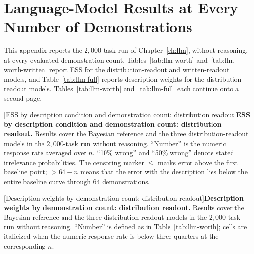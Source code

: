 \chapter{Language-Model Results at Every Number of Demonstrations}\label{app:llm-tables}

This appendix reports the $2{,}000$-task run of Chapter~\ref{ch:llm}, without reasoning, at every evaluated demonstration count. Tables~\ref{tab:llm-worth} and~\ref{tab:llm-worth-written} report ESS for the distribution-readout and written-readout models, and Table~\ref{tab:llm-full} reports description weights for the distribution-readout models. Tables~\ref{tab:llm-worth} and~\ref{tab:llm-full} each continue onto a second page.

\clearpage
\begin{center}
[ESS by description condition and demonstration count: distribution readout]{\textbf{ESS by description condition and demonstration count: distribution readout.} Results cover the Bayesian reference and the three distribution-readout models in the $2{,}000$-task run without reasoning. ``Number'' is the numeric response rate averaged over $n$. ``10\% wrong'' and ``50\% wrong'' denote stated irrelevance probabilities. The censoring marker $\leq$ marks error above the first baseline point; $>64-n$ means that the error with the description lies below the entire baseline curve through $64$ demonstrations.}\label{tab:llm-worth}
\end{center}
{\scriptsize\setlength{\tabcolsep}{1.5pt}}

\begin{table}[p]
\centering
\caption[ESS by description condition and demonstration count: written readout]{\textbf{ESS by description condition and demonstration count: written readout.} Results cover the three written-readout models in the $2{,}000$-task run without reasoning. Replies without a qualifying number are excluded. Columns and reference values follow Table~\ref{tab:llm-worth}.}\label{tab:llm-worth-written}
\vspace{3pt}
{\scriptsize\setlength{\tabcolsep}{1.5pt}}
\end{table}

\clearpage
\begin{center}
[Description weights by demonstration count: distribution readout]{\textbf{Description weights by demonstration count: distribution readout.} Results cover the Bayesian reference and the three distribution-readout models in the $2{,}000$-task run without reasoning. ``Number'' is defined as in Table~\ref{tab:llm-worth}; cells are italicized when the numeric response rate is below three quarters at the corresponding $n$.}\label{tab:llm-full}
\end{center}
{\scriptsize\setlength{\tabcolsep}{1.5pt}}
